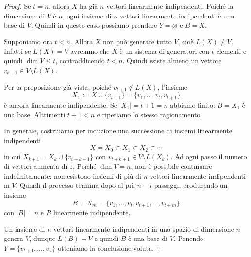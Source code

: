 \begin{proof}
    Se \(t=n\), allora \(X\) ha già \(n\) vettori linearmente indipendenti. Poiché la dimensione di \(V\) è \(n\), ogni insieme di \(n\) vettori linearmente indipendenti è una base di \(V\). Quindi in questo caso possiamo prendere \(Y=\varnothing\) e \(B=X\).

    Supponiamo ora \(t<n\). Allora \(X\) non può generare tutto \(V\), cioè \(L(X)\neq V\). Infatti se \(L(X)=V\) avremmo che \(X\) è un sistema di generatori con \(t\) elementi e quindi \(\dim V\le t\), contraddicendo \(t<n\). Quindi esiste almeno un vettore \(v_{t+1}\in V\setminus L(X)\).

    Per la proposizione già vista, poiché \(v_{t+1}\notin L(X)\), l'insieme
    \[
      X_1 := X\cup\{v_{t+1}\} = \{v_1,\dots,v_t,v_{t+1}\}
    \]
    è ancora linearmente indipendente. Se \(|X_1|=t+1=n\) abbiamo finito: \(B=X_1\) è una base. Altrimenti \(t+1<n\) e ripetiamo lo stesso ragionamento.

    In generale, costruiamo per induzione una successione di insiemi linearmente indipendenti
    \[
      X = X_0 \subset X_1 \subset X_2 \subset \cdots
    \]
    in cui \(X_{k+1}=X_k\cup\{v_{t+k+1}\}\) con \(v_{t+k+1}\in V\setminus L(X_k)\). Ad ogni passo il numero di vettori aumenta di \(1\). Poiché \(\dim V=n\), non è possibile continuare indefinitamente: non esistono insiemi di più di \(n\) vettori linearmente indipendenti in \(V\). Quindi il processo termina dopo al più \(n-t\) passaggi, producendo un insieme
    \[
      B = X_{m} = \{v_1,\dots,v_t,v_{t+1},\dots,v_{t+m}\}
    \]
    con \(|B|=n\) e \(B\) linearmente indipendente.

    Un insieme di \(n\) vettori linearmente indipendenti in uno spazio di dimensione \(n\) genera \(V\), dunque \(L(B)=V\) e quindi \(B\) è una base di \(V\). Ponendo \(Y=\{v_{t+1},\dots,v_n\}\) otteniamo la conclusione voluta.
\end{proof}

